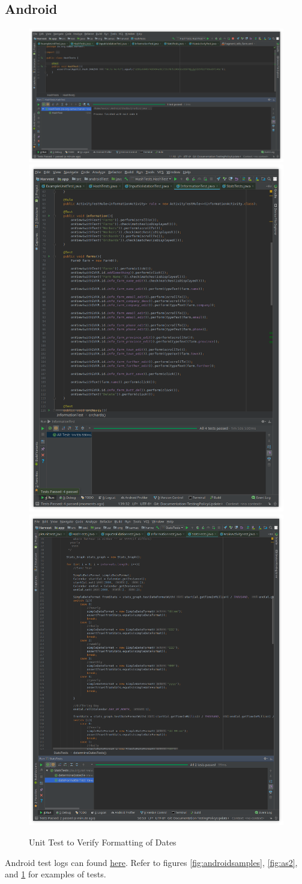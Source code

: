 \documentclass[12pt]{article}
\begin{document}
\subsection{Android}
\begin{figure}[ht!]
            \includegraphics[width=.3\textwidth]{images/hash.png}
            \includegraphics[width=.3\textwidth]{images/info.png}
            \includegraphics[width=.3\textwidth]{images/stats.png}
            \caption{Unit Test to Verify Functioning of Hash Function}
                        \label{fig:androidsamples}
            \caption{UI Test to Verify Functioning of Information Editing}
            \label{fig:as2}
            \caption{Unit Test to Verify Formatting of Dates}
            \label{fig:as3}

        \end{figure}
Android test logs can found \href{https://github.com/BinaryNinjaz/COS301-Capstone/tree/master/Source/Android/Harvest/test-logs}{here}. Refer to figures \ref{fig:androidsamples}, \ref{fig:as2}, and \ref{fig:as3} for examples of tests.
\end{document}
